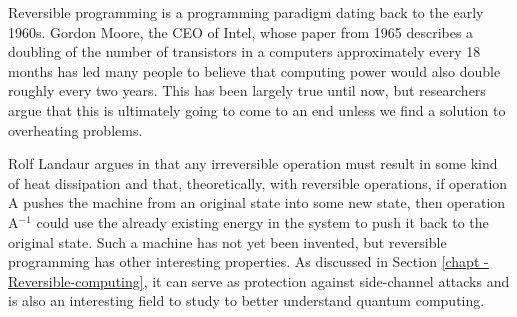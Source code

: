 Reversible programming is a programming paradigm dating back to the early 1960s. Gordon Moore, the CEO of Intel, whose paper from 1965 describes a doubling of the number of transistors in a computers approximately every 18 months has led many people to believe that computing power would also double roughly every two years. This has been largely true until now, but researchers argue that this is ultimately going to come to an end unless we find a solution to overheating problems.

Rolf Landaur argues in \cite{Irreversibility_paper} that any irreversible operation must result in some kind of heat dissipation and that, theoretically, with reversible operations, if operation A pushes the machine from an original state into some new state, then operation A$^{-1}$ could use the already existing energy in the system to push it back to the original state.
Such a machine has not yet been invented, but reversible programming has other interesting properties.
As discussed in Section \ref{chapt - Reversible-computing}, it can serve as protection against side-channel attacks and is also an interesting field to study to better understand quantum computing.

